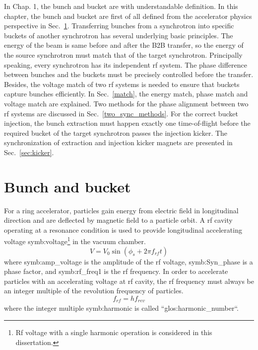 In Chap. 1, the bunch and bucket are with understandable definition. In this chapter, the bunch and bucket are first of all defined from the accelerator physics perspective in Sec.~\ref{bunch and bucket}. Transferring bunches from a synchrotron into specific buckets of another synchrotron has several underlying basic principles. The energy of the beam is same before and after the B2B transfer, so the energy of the source synchrotron must match that of the target synchrotron. Principally speaking, every synchrotron has its independent rf system. The phase difference between bunches and the buckets must be precisely controlled before the transfer. Besides, the voltage match of two rf systems is needed to ensure that buckets capture bunches efficiently. In Sec.~\ref{match}, the energy match, phase match and voltage match are explained. Two methods for the phase alignment between two rf systems are discussed in Sec.~\ref{two_sync_methods}. For the correct bucket injection, the bunch extraction must happen exactly one time-of-flight before the required bucket of the target synchrotron passes the injection kicker. The synchronization of extraction and injection kicker magnets are presented in Sec.~\ref{sec:kicker}.

\section{Bunch and bucket}
\label{bunch and bucket}
For a ring accelerator, particles gain energy from electric field in longitudinal direction and are deflected by magnetic field to a particle orbit. A rf cavity operating at a resonance condition is used to provide longitudinal accelerating voltage
\gls{symb:voltage}\footnote{Rf voltage with a single harmonic operation is considered in this dissertation.} in the vacuum chamber.
\begin{equation}
V=V_0\sin(\phi_\mathit{s}+2\pi f_\mathit{rf}t)
\end{equation}
where \gls{symb:amp_voltage} is the amplitude of the rf voltage, \gls{symb:Syn_phase} is a phase factor, and \gls{symb:rf_freq1} is the rf frequency. In order to accelerate particles with an accelerating voltage at rf cavity, the rf frequency must always be an integer multiple of the revolution frequency of particles. 
\begin{equation}
	f_{\mathit{rf}}=hf_{\mathit{rev}}\label{harmonic_number}
\end{equation}
where the integer multiple \gls{symb:harmonic} is called ``\gls{glos:harmonic_number}``. 

